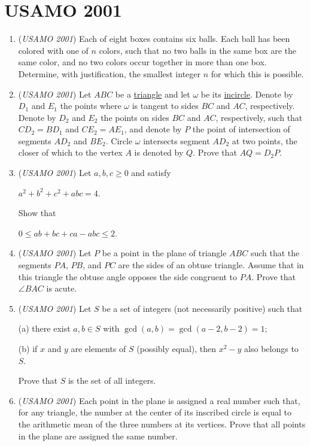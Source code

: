 \section{USAMO 2001}
        \begin{enumerate}
        	\item (\textit{USAMO 2001}) Each of eight boxes contains six balls. Each ball has been colored with one of $n$ colors, such that no two balls in the same box are the same color, and no two colors occur together in more than one box. Determine, with justification, the smallest integer $n$ for which this is possible.


 

	\item (\textit{USAMO 2001}) Let $ABC$ be a \href{https://artofproblemsolving.com/wiki/index.php?title=Triangle}{triangle} and let $\omega$ be its \href{https://artofproblemsolving.com/wiki/index.php?title=Incircle}{incircle}. Denote by $D_1$ and $E_1$ the points where $\omega$ is tangent to sides $BC$ and $AC$, respectively. Denote by $D_2$ and $E_2$ the points on sides $BC$ and $AC$, respectively, such that $CD_2 = BD_1$ and $CE_2 = AE_1$, and denote by $P$ the point of intersection of segments $AD_2$ and $BE_2$. Circle $\omega$ intersects segment $AD_2$ at two points, the closer of which to the vertex $A$ is denoted by $Q$. Prove that $AQ = D_2P$.


 

	\item (\textit{USAMO 2001}) Let $a, b, c \geq 0$ and satisfy


 $a^2 + b^2 + c^2 + abc = 4.$

 Show that


 $0\leq ab + bc + ca - abc \leq 2.$


	\item (\textit{USAMO 2001}) Let $P$ be a point in the plane of triangle $ABC$ such that the segments $PA$, $PB$, and $PC$ are the sides of an obtuse triangle. Assume that in this triangle the obtuse angle opposes the side congruent to $PA$. Prove that $\angle BAC$ is acute.


 

	\item (\textit{USAMO 2001}) Let $S$ be a set of integers (not necessarily positive) such that


 (a) there exist $a,b \in S$ with $\gcd(a,b) = \gcd(a - 2,b - 2) = 1$;


 (b) if $x$ and $y$ are elements of $S$ (possibly equal), then $x^2 - y$ also belongs to $S$. 


 Prove that $S$ is the set of all integers.


 

	\item (\textit{USAMO 2001}) Each point in the plane is assigned a real number such that, for any triangle, the number at the center of its inscribed circle is equal to the arithmetic mean of the three numbers at its vertices. Prove that all points in the plane are assigned the same number.


 

\end{enumerate}